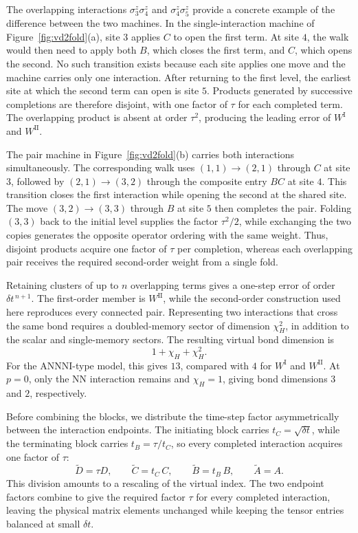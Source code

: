 The overlapping interactions $\sigma^z_3\sigma^z_4$ and $\sigma^z_4\sigma^z_5$ provide a concrete example of the difference between the two machines. In the single-interaction machine of Figure~\ref{fig:vd2fold}(a), site $3$ applies $C$ to open the first term. At site $4$, the walk would then need to apply both $B$, which closes the first term, and $C$, which opens the second. No such transition exists because each site applies one move and the machine carries only one interaction. After returning to the first level, the earliest site at which the second term can open is site $5$. Products generated by successive completions are therefore disjoint, with one factor of $\tau$ for each completed term. The overlapping product is absent at order $\tau^2$, producing the leading error of $W^{\mathrm{I}}$ and $W^{\mathrm{II}}$.

The pair machine in Figure~\ref{fig:vd2fold}(b) carries both interactions simultaneously. The corresponding walk uses $(1,1)\to(2,1)$ through $C$ at site $3$, followed by $(2,1)\to(3,2)$ through the composite entry $BC$ at site $4$. This transition closes the first interaction while opening the second at the shared site. The move $(3,2)\to(3,3)$ through $B$ at site $5$ then completes the pair. Folding $(3,3)$ back to the initial level supplies the factor $\tau^2/2$, while exchanging the two copies generates the opposite operator ordering with the same weight. Thus, disjoint products acquire one factor of $\tau$ per completion, whereas each overlapping pair receives the required second-order weight from a single fold.

Retaining clusters of up to $n$ overlapping terms gives a one-step error of order $\delta t^{\,n+1}$. The first-order member is $W^{\mathrm{II}}$, while the second-order construction used here reproduces every connected pair. Representing two interactions that cross the same bond requires a doubled-memory sector of dimension $\chi_H^2$, in addition to the scalar and single-memory sectors. The resulting virtual bond dimension is
\begin{equation}
  1+\chi_H+\chi_H^2.
  \label{eq:app:mpo:vd2_bond}
\end{equation}
For the ANNNI-type model, this gives $13$, compared with $4$ for $W^{\mathrm{I}}$ and $W^{\mathrm{II}}$. At $p=0$, only the \ac{NN} interaction remains and $\chi_H=1$, giving bond dimensions $3$ and $2$, respectively.

Before combining the blocks, we distribute the time-step factor asymmetrically between the interaction endpoints. The initiating block carries $t_C=\sqrt{\delta t}$, while the terminating block carries $t_B=\tau/t_C$, so every completed interaction acquires one factor of $\tau$:
\begin{equation}
  \tilde D = \tau D, \qquad \tilde C = t_C\, C, \qquad \tilde B = t_B\, B, \qquad \tilde A = A .
  \label{eq:app:mpo:scaling}
\end{equation}
This division amounts to a rescaling of the virtual index. The two endpoint factors combine to give the required factor $\tau$ for every completed interaction, leaving the physical matrix elements unchanged while keeping the tensor entries balanced at small $\delta t$.

